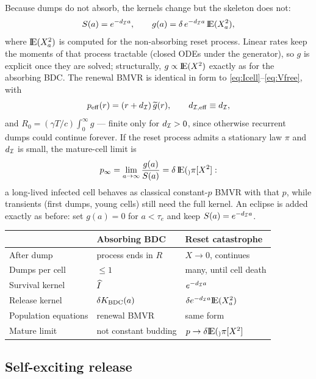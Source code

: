 Because dumps do not absorb, the kernels change but the skeleton does not:
\begin{equation}
S(a)=e^{-d_{\mathcal{I}}a},
\qquad
g(a)=\delta\,e^{-d_{\mathcal{I}}a}\,{\rm I}\!{\rm E}(X_a^2),
\end{equation}
where ${\rm I}\!{\rm E}(X_a^2)$ is computed for the non-absorbing reset process.
Linear rates keep the moments of that process tractable (closed ODEs under
the generator), so $g$ is explicit once they are solved; structurally,
$g\propto{\rm I}\!{\rm E}(X^2)$ exactly as for the absorbing BDC. The renewal BMVR is
identical in form to \eqref{eq:Icell}--\eqref{eq:Vfree}, with
\begin{equation}
p_{\rm eff}(r)=\left( r+d_{\mathcal{I}}\right)\widetilde{g}(r),
\qquad
d_{\mathcal{I},{\rm eff}}\equiv d_{\mathcal{I}},
\end{equation}
and $R_0=(\gamma T/c)\int_0^\infty g$ --- finite only for $d_{\mathcal{I}}>0$,
since otherwise recurrent dumps could continue forever. If the reset process
admits a stationary law $\pi$ and $d_{\mathcal{I}}$ is small, the mature-cell
limit is
\begin{equation}
p_\infty=\lim_{a\to\infty}\frac{g(a)}{S(a)}=\delta\,{\rm I}\!{\rm E}(_)\pi[X^2]:
\end{equation}
a long-lived infected cell behaves as classical constant-$p$ BMVR with that
$p$, while transients (first dumps, young cells) still need the full kernel.
An eclipse is added exactly as before: set $g(a)=0$ for $a<\tau_e$ and keep
$S(a)=e^{-d_{\mathcal{I}}a}$.

\begin{center}
\renewcommand{\arraystretch}{1.2}
\small
\begin{tabular}{@{}lll@{}}
\toprule
 & Absorbing BDC & Reset catastrophe \\
\midrule
After dump & process ends in $R$ & $X\to0$, continues \\
Dumps per cell & $\le1$ & many, until cell death \\
Survival kernel & $\widehat{I}$ & $e^{-d_{\mathcal{I}}a}$ \\
Release kernel & $\delta K_{\rm BDC}(a)$ & $\delta e^{-d_{\mathcal{I}}a}{\rm I}\!{\rm E}(X_a^2)$ \\
Population equations & renewal BMVR & same form \\
Mature limit & not constant budding & $p\to\delta{\rm I}\!{\rm E}(_)\pi[X^2]$ \\
\bottomrule
\end{tabular}
\end{center}

\subsection{Self-exciting release}
\label{sec:self-excite}


